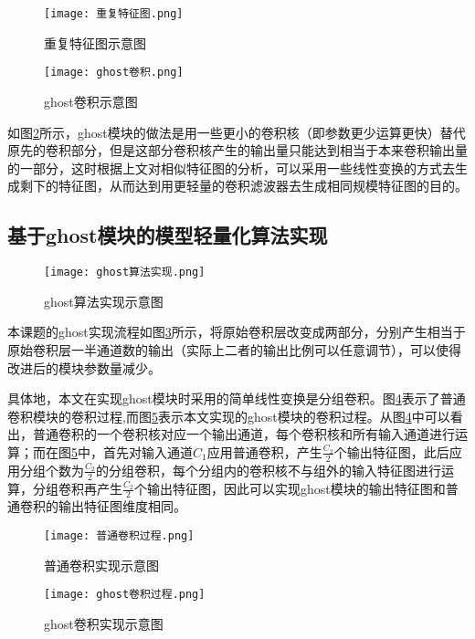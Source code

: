 \begin{figure}[htbp]
    \centering
    \texttt{[image: 重复特征图.png]}
    \caption{重复特征图示意图}
    \label{identical}
\end{figure}

\begin{figure}[htbp]
    \centering
    \texttt{[image: ghost卷积.png]}
    \caption{ghost卷积示意图}
    \label{ghost1}
\end{figure}

如图\ref{ghost1}所示，ghost模块的做法是用一些更小的卷积核（即参数更少运算更快）替代原先的卷积部分，但是这部分卷积核产生的输出量只能达到相当于本来卷积输出量的一部分，这时根据上文对相似特征图的分析，可以采用一些线性变换的方式去生成剩下的特征图，从而达到用更轻量的卷积滤波器去生成相同规模特征图的目的。

\subsection{基于ghost模块的模型轻量化算法实现}

\begin{figure}[htbp]
    \centering
    \texttt{[image: ghost算法实现.png]}
    \caption{ghost算法实现示意图}
    \label{ghost2}
\end{figure}

本课题的ghost实现流程如图\ref{ghost2}所示，将原始卷积层改变成两部分，分别产生相当于原始卷积层一半通道数的输出（实际上二者的输出比例可以任意调节），可以使得改进后的模块参数量减少。

具体地，本文在实现ghost模块时采用的简单线性变换是分组卷积。图\ref{convp}表示了普通卷积模块的卷积过程,而图\ref{ghostp}表示本文实现的ghost模块的卷积过程。从图\ref{convp}中可以看出，普通卷积的一个卷积核对应一个输出通道，每个卷积核和所有输入通道进行运算；而在图\ref{ghostp}中，首先对输入通道$C_1$应用普通卷积，产生$\frac{C_2}{2}$个输出特征图，此后应用分组个数为$\frac{C_2}{2}$的分组卷积，每个分组内的卷积核不与组外的输入特征图进行运算，分组卷积再产生$\frac{C_2}{2}$个输出特征图，因此可以实现ghost模块的输出特征图和普通卷积的输出特征图维度相同。
\begin{figure}[htbp]
    \centering
    \texttt{[image: 普通卷积过程.png]}
    \caption{普通卷积实现示意图}
    \label{convp}
\end{figure}

\begin{figure}[htbp]
    \centering
    \texttt{[image: ghost卷积过程.png]}
    \caption{ghost卷积实现示意图}
    \label{ghostp}
\end{figure}

